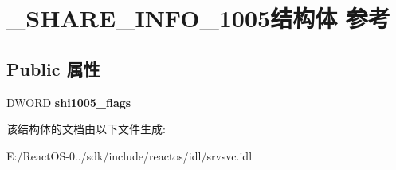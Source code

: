 \hypertarget{struct___s_h_a_r_e___i_n_f_o__1005}{}\section{\+\_\+\+S\+H\+A\+R\+E\+\_\+\+I\+N\+F\+O\+\_\+1005结构体 参考}
\label{struct___s_h_a_r_e___i_n_f_o__1005}
\subsection*{Public 属性}
\begin{DoxyCompactItemize}
\item 
\mbox{\label{struct___s_h_a_r_e___i_n_f_o__1005_a23d7c31a9947b5353a6b5d33fa4779a2}} 
D\+W\+O\+RD {\bfseries shi1005\+\_\+flags}
\end{DoxyCompactItemize}


该结构体的文档由以下文件生成\+:\begin{DoxyCompactItemize}
\item 
E\+:/\+React\+O\+S-\/0../sdk/include/reactos/idl/srvsvc.\+idl\end{DoxyCompactItemize}
